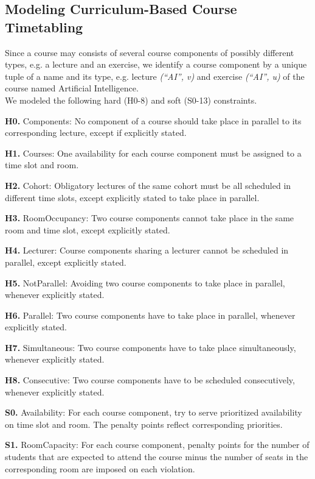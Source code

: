 \documentclass{easychair}
\begin{document}
\subsection{Modeling Curriculum-Based Course Timetabling}%
\label{subsec:modeling}
  Since a course may consists of several course components of possibly different types, e.g. a lecture and an exercise, we identify a course component by a unique tuple of a name and its type, e.g. lecture \textit{(``AI'', v)} and exercise \textit{(``AI'', u)} of the course named Artificial Intelligence. \\
  We modeled the following hard (H0-8) and soft (S0-13) constraints. 

  \textbf{H0.} Components: No component of a course should take place in parallel to its corresponding lecture, except if explicitly stated. 

  \textbf{H1.} Courses: One availability for each course component must be assigned to a time slot and room. 

  \textbf{H2.} Cohort: Obligatory lectures of the same cohort must be all scheduled in different time slots, except explicitly stated to take place in parallel. 

  \textbf{H3.} RoomOccupancy: Two course components cannot take place in the same room and time slot, except explicitly stated. 

  \textbf{H4.} Lecturer: Course components sharing a lecturer cannot be scheduled in parallel, except explicitly stated. 

  \textbf{H5.} NotParallel: Avoiding two course components to take place in parallel, whenever explicitly stated.

  \textbf{H6.} Parallel: Two course components have to take place in parallel, whenever explicitly stated.

  \textbf{H7.} Simultaneous: Two course components have to take place simultaneously, whenever explicitly stated.

  \textbf{H8.} Consecutive: Two course components have to be scheduled consecutively, whenever explicitly stated.

  \textbf{S0.} Availability: For each course component, try to serve prioritized availability on time slot and room. The penalty points reflect corresponding priorities.  

  \textbf{S1.} RoomCapacity: For each course component, penalty points for the number of students that are expected to attend the course minus the number of seats in the corresponding room are imposed on each violation. 
\end{document}
